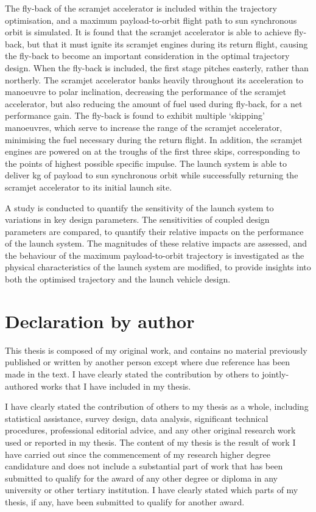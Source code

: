  
 The fly-back of the scramjet accelerator is included within the trajectory optimisation, and a maximum payload-to-orbit flight path to sun synchronous orbit is simulated. 
 It is found that the scramjet accelerator is able to achieve fly-back, but that it must ignite its scramjet engines during its return flight, causing the fly-back to become an important consideration in the optimal trajectory design. When the fly-back is included, the first stage pitches easterly, rather than northerly. The scramjet accelerator banks heavily throughout its acceleration to manoeuvre to polar inclination, decreasing the performance of the scramjet accelerator, but also reducing the amount of fuel used during fly-back, for a net performance gain. 
The fly-back is found to exhibit multiple `skipping' manoeuvres, which serve to increase the range of the scramjet accelerator, minimising the fuel necessary during the return flight. In addition, the scramjet engines are powered on at the troughs of the first three skips, corresponding to the points of highest possible specific impulse. The launch system is able to deliver \PayloadToOrbitStandard kg of payload to sun synchronous orbit while successfully returning the scramjet accelerator to its initial launch site.  

A study is conducted to quantify the sensitivity of the launch system to variations in key design parameters. 
The sensitivities of coupled design parameters are compared, to quantify their relative impacts on the performance of the launch system. The magnitudes of these relative impacts are assessed, and the behaviour of the maximum payload-to-orbit trajectory is investigated as the physical characteristics of the launch system are modified, to provide insights into both the optimised trajectory and the launch vehicle design. 

 

\clearpage
\section*{Declaration by author}

  This thesis is composed of my original work, and contains no material previously published or written by another person except where due reference has been made in the text. I have clearly stated the contribution by others to jointly-authored works that I have included in my thesis.

  I have clearly stated the contribution of others to my thesis as a whole, including statistical assistance, survey design, data analysis, significant technical procedures, professional editorial advice, and any other original research work used or reported in my thesis. The content of my thesis is the result of work I have carried out since the commencement of my research higher degree candidature and does not include a substantial part of work that has been submitted to qualify for the award of any other degree or diploma in any university or other tertiary institution. I have clearly stated which parts of my thesis, if any, have been submitted to qualify for another award.

